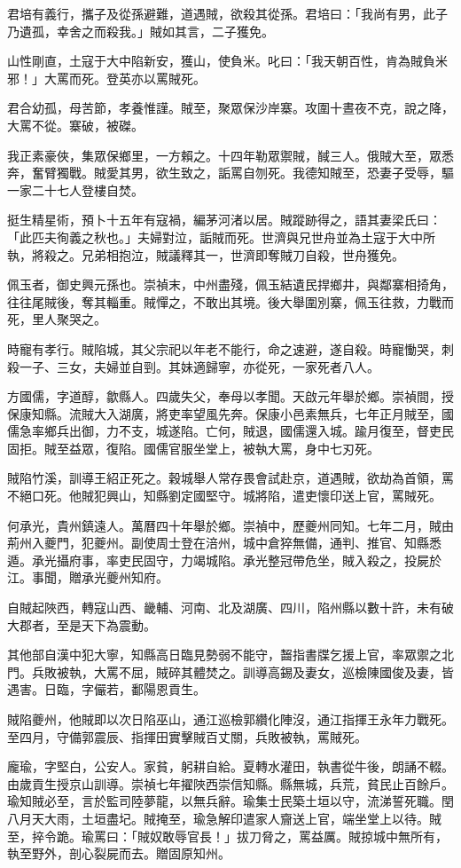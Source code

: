\begin{pinyinscope}
君培有義行，攜子及從孫避難，道遇賊，欲殺其從孫。君培曰：「我尚有男，此子乃遺孤，幸舍之而殺我。」賊如其言，二子獲免。

山性剛直，土寇于大中陷新安，獲山，使負米。叱曰：「我天朝百性，肯為賊負米邪！」大罵而死。登英亦以罵賊死。

君合幼孤，母苦節，孝養惟謹。賊至，聚眾保沙岸寨。攻圍十晝夜不克，說之降，大罵不從。寨破，被磔。

我正素豪俠，集眾保鄉里，一方賴之。十四年勒眾禦賊，馘三人。俄賊大至，眾悉奔，奮臂獨戰。賊愛其男，欲生致之，詬罵自刎死。我德知賊至，恐妻子受辱，驅一家二十七人登樓自焚。

挺生精星術，預卜十五年有寇禍，編茅河渚以居。賊蹤跡得之，語其妻梁氏曰：「此匹夫徇義之秋也。」夫婦對泣，詬賊而死。世濟與兄世舟並為土寇于大中所執，將殺之。兄弟相抱泣，賊議釋其一，世濟即奪賊刀自殺，世舟獲免。

佩玉者，御史興元孫也。崇禎末，中州盡殘，佩玉結遺民捍鄉井，與鄰寨相掎角，往往尾賊後，奪其輜重。賊憚之，不敢出其境。後大舉圍別寨，佩玉往救，力戰而死，里人聚哭之。

時寵有孝行。賊陷城，其父宗祀以年老不能行，命之速避，遂自殺。時寵慟哭，刺殺一子、三女，夫婦並自剄。其妹適歸寧，亦從死，一家死者八人。

方國儒，字道醇，歙縣人。四歲失父，奉母以孝聞。天啟元年舉於鄉。崇禎間，授保康知縣。流賊大入湖廣，將吏率望風先奔。保康小邑素無兵，七年正月賊至，國儒急率鄉兵出御，力不支，城遂陷。亡何，賊退，國儒還入城。踰月復至，督吏民固拒。賊至益眾，復陷。國儒官服坐堂上，被執大罵，身中七刃死。

賊陷竹溪，訓導王紹正死之。穀城舉人常存畏會試赴京，道遇賊，欲劫為首領，罵不絕口死。他賊犯興山，知縣劉定國堅守。城將陷，遣吏懷印送上官，罵賊死。

何承光，貴州鎮遠人。萬曆四十年舉於鄉。崇禎中，歷夔州同知。七年二月，賊由荊州入夔門，犯夔州。副使周士登在涪州，城中倉猝無備，通判、推官、知縣悉遁。承光攝府事，率吏民固守，力竭城陷。承光整冠帶危坐，賊入殺之，投屍於江。事聞，贈承光夔州知府。

自賊起陜西，轉寇山西、畿輔、河南、北及湖廣、四川，陷州縣以數十許，未有破大郡者，至是天下為震動。

其他部自漢中犯大寧，知縣高日臨見勢弱不能守，齧指書牒乞援上官，率眾禦之北門。兵敗被執，大罵不屈，賊碎其體焚之。訓導高錫及妻女，巡檢陳國俊及妻，皆遇害。日臨，字儼若，鄱陽恩貢生。

賊陷夔州，他賊即以次日陷巫山，通江巡檢郭纘化陣沒，通江指揮王永年力戰死。至四月，守備郭震辰、指揮田實擊賊百丈關，兵敗被執，罵賊死。

龐瑜，字堅白，公安人。家貧，躬耕自給。夏轉水灌田，執書從牛後，朗誦不輟。由歲貢生授京山訓導。崇禎七年擢陜西崇信知縣。縣無城，兵荒，貧民止百餘戶。瑜知賊必至，言於監司陸夢龍，以無兵辭。瑜集士民築土垣以守，流涕誓死職。閏八月天大雨，土垣盡圮。賊掩至，瑜急解印遣家人齎送上官，端坐堂上以待。賊至，捽令跪。瑜罵曰：「賊奴敢辱官長！」拔刀脅之，罵益厲。賊掠城中無所有，執至野外，剖心裂屍而去。贈固原知州。


\end{pinyinscope}
